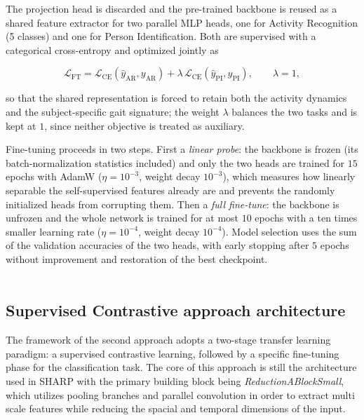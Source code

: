The projection head is discarded and the pre-trained backbone is reused as a
shared feature extractor for two parallel MLP heads,
one for Activity Recognition (5 classes) and one for Person Identification.
Both are supervised with a categorical cross-entropy and optimized jointly as

\begin{equation}
\mathcal{L}_{\mathrm{FT}} =
\mathcal{L}_{\mathrm{CE}}\!\left(\hat{y}_{\mathrm{AR}}, y_{\mathrm{AR}}\right)
+ \lambda\,
\mathcal{L}_{\mathrm{CE}}\!\left(\hat{y}_{\mathrm{PI}}, y_{\mathrm{PI}}\right),
\qquad \lambda = 1,
\label{eq:twohead_loss}
\end{equation}

so that the shared representation is forced to retain both the activity
dynamics and the subject-specific gait signature; the weight $\lambda$
balances the two tasks and is kept at $1$, since neither objective is
treated as auxiliary.

Fine-tuning proceeds in two steps. First a \emph{linear probe}: the backbone
is frozen (its batch-normalization statistics included) and only the two heads
are trained for $15$ epochs with AdamW ($\eta=10^{-3}$, weight decay
$10^{-3}$), which measures how linearly separable the self-supervised features
already are and prevents the randomly initialized heads from corrupting them.
Then a \emph{full fine-tune}: the backbone is unfrozen and the whole network is
trained for at most $10$ epochs with a ten times smaller learning rate
($\eta=10^{-4}$, weight decay $10^{-4}$). Model selection uses the sum of the
validation accuracies of the two heads, with early stopping after $5$ epochs
without improvement and restoration of the best checkpoint.\\\\
\setcounter{subsection}{0}
\subsection{Supervised Contrastive approach architecture}
The framework of the second approach adopts a two-stage transfer learning paradigm: a supervised contrastive learning, followed by a specific fine-tuning phase for the classification task.
The core of this approach is still the architecture used in SHARP \cite{sharp} with the primary building block being \textit{ReductionABlockSmall}, which utilizes pooling branches and parallel convolution in order to extract multi scale features while reducing the spacial and temporal dimensions of the input.
